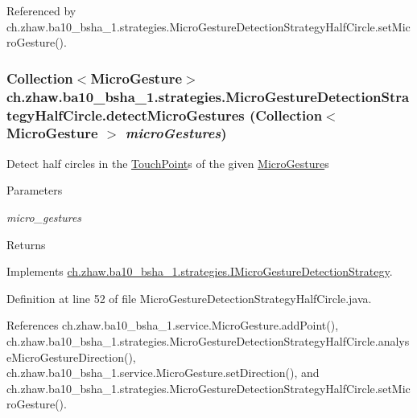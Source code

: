 Referenced by ch.zhaw.ba10\_\-bsha\_\-1.strategies.MicroGestureDetectionStrategyHalfCircle.setMicroGesture().\hypertarget{classch_1_1zhaw_1_1ba10__bsha__1_1_1strategies_1_1MicroGestureDetectionStrategyHalfCircle_a780f7ded471f8e1dbd141518c41c060e}{
\subsubsection[{detectMicroGestures}]{\setlength{\rightskip}{0pt plus 5cm}Collection$<${\bf MicroGesture}$>$ ch.zhaw.ba10\_\-bsha\_\-1.strategies.MicroGestureDetectionStrategyHalfCircle.detectMicroGestures (Collection$<$ {\bf MicroGesture} $>$ {\em microGestures})}}
\label{classch_1_1zhaw_1_1ba10__bsha__1_1_1strategies_1_1MicroGestureDetectionStrategyHalfCircle_a780f7ded471f8e1dbd141518c41c060e}
Detect half circles in the \hyperlink{classch_1_1zhaw_1_1ba10__bsha__1_1_1TouchPoint}{TouchPoint}s of the given \hyperlink{}{MicroGesture}s


\begin{DoxyParams}{Parameters}
\item[{\em micro\_\-gestures}]\end{DoxyParams}
\begin{DoxyReturn}{Returns}

\end{DoxyReturn}


Implements \hyperlink{interfacech_1_1zhaw_1_1ba10__bsha__1_1_1strategies_1_1IMicroGestureDetectionStrategy_a8593331fb67e5d4dc890d3db9f2d1b58}{ch.zhaw.ba10\_\-bsha\_\-1.strategies.IMicroGestureDetectionStrategy}.

Definition at line 52 of file MicroGestureDetectionStrategyHalfCircle.java.

References ch.zhaw.ba10\_\-bsha\_\-1.service.MicroGesture.addPoint(), ch.zhaw.ba10\_\-bsha\_\-1.strategies.MicroGestureDetectionStrategyHalfCircle.analyseMicroGestureDirection(), ch.zhaw.ba10\_\-bsha\_\-1.service.MicroGesture.setDirection(), and ch.zhaw.ba10\_\-bsha\_\-1.strategies.MicroGestureDetectionStrategyHalfCircle.setMicroGesture().

